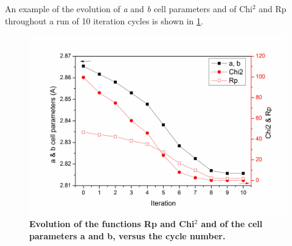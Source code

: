An example of the evolution of \textit{a} and \textit{b} cell parameters and of Chi$^{2}$ and Rp throughout a run of 10 iteration cycles is shown in \ref{cycles}.

\begin{figure}[!htbp]
\begin{center}
\includegraphics [width=4 in]{chi2_Rf.jpg}
\caption{\bf Evolution of the functions Rp and Chi$^{2}$ and of the cell parameters a and b, versus the cycle number. }
\label{cycles}
\end{center}
\end{figure}
